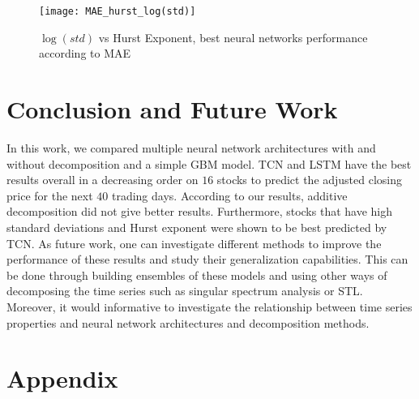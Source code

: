 \documentclass[12pt, A4]{article}
\begin{document}
\begin{figure}[H]
	\centering
	\texttt{[image: MAE\_hurst\_log(std)]}
	\caption{$\log(std)$ vs Hurst Exponent, best neural networks performance according to MAE}
	\label{MAE_hurst_log(std)}
\end{figure}

\section{Conclusion and Future Work}
In this work, we compared multiple neural network architectures with and without decomposition and a simple GBM model. TCN and LSTM have the best results overall in a decreasing order on $16$ stocks to predict the adjusted closing price for the next $40$ trading days. According to our results, additive decomposition did not give better results. Furthermore, stocks that have high standard deviations and Hurst exponent were shown to be best predicted by TCN. As future work, one can investigate different methods to improve the performance of these results and study their generalization capabilities. This can be done through building ensembles of these models and using other ways of decomposing the time series such as singular spectrum analysis or STL.  Moreover, it would informative to investigate the relationship between time series properties and neural network architectures and decomposition methods.




\clearpage

\section{Appendix}
\end{document}
